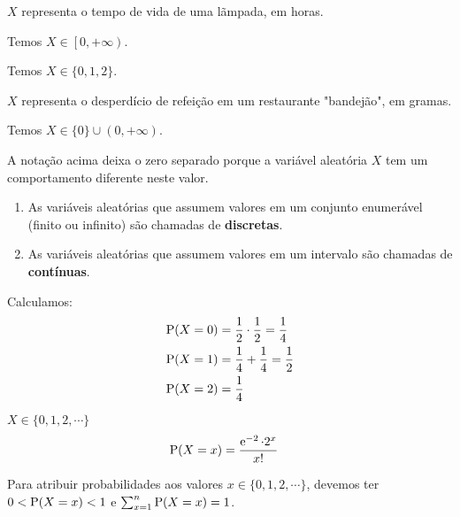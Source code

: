 \begin{example}\label{exp:ch02-va-lampada}
    $X$ representa o tempo de vida de uma lãmpada, em horas.

    Temos $X \in \left[0, +\infty\right)$.
\end{example}

\begin{example}
    Temos $X \in \{0, 1, 2\}$.
\end{example}

\begin{example}\label{exp:ch02-va-desoerdicio}
    $X$ representa o desperdício de refeição em um restaurante
    "bandejão", em gramas.

    Temos $X \in \{0\} \cup \left(0, +\infty\right)$.

    \begin{obs}
        A notação acima deixa o zero separado
        porque a variável aleatória $X$ tem um comportamento
        diferente neste valor.
    \end{obs}
\end{example}

\begin{definition}
    \begin{enumerate}
        \item \label{it:ch02-def-discretas}
        As variáveis aleatórias que assumem valores em
        um conjunto enumerável (finito ou infinito) são chamadas
        de \textbf{discretas}.
        \item \label{it:ch02-def-contínuas}
        As variáveis aleatórias que assumem valores em
        um intervalo são chamadas de \textbf{contínuas}.
    \end{enumerate}
\end{definition}

\begin{example}
    Calculamos:
    \begin{align*}
        \operatorname{P}(X = 0) &= \frac{1}{2} \cdot \frac{1}{2} = \frac{1}{4} \\
        \operatorname{P}(X = 1) &= \frac{1}{4} + \frac{1}{4} = \frac{1}{2} \\
        \operatorname{P}(X = 2) &= \frac{1}{4}
    \end{align*}
\end{example}

\begin{example}
    $X \in \{0, 1, 2, \cdots\}$
    \begin{align*}
        \operatorname{P}(X = x) &= \frac{\operatorname{e}^{-2}\cdot 2^x}{x!}
    \end{align*}

    Para atribuir probabilidades aos valores $x \in \{0, 1, 2, \cdots\}$,
    devemos ter $0 < \operatorname{P}(X = x) < 1$ e $\sum_{x=1}^n \operatorname{P}(X = x) = 1$.
\end{example}

